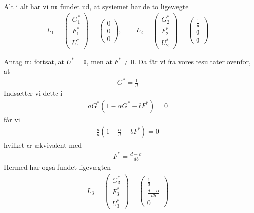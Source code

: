 \documentclass[12pt]{article}
\begin{document}
Alt i alt har vi nu fundet ud, at systemet har de to ligevægte
\begin{align}
L_1 = \begin{pmatrix}
G_1^* \\ F^*_1 \\ U_1^*
\end{pmatrix} = \begin{pmatrix}
0 \\ 0 \\ 0
\end{pmatrix}, \qquad 
L_2 = \begin{pmatrix}
G_2^* \\ F^*_2 \\ U_2^*
\end{pmatrix} = \begin{pmatrix}
\frac{1}{\alpha} \\ 0 \\ 0
\end{pmatrix}
\end{align}

Antag nu fortsat, at $U^*=0$, men at $F^* \neq 0$. Da får vi fra vores resultater ovenfor, at
\begin{align}
G^* = \frac{1}{d}
\end{align}
Indsætter vi dette i
\begin{align}
aG^*(1 - \alpha G^* - bF^*) = 0
\end{align}
får vi
\begin{align}
\frac{a}{d}(1 - \frac{\alpha}{d} - bF^*) = 0
\end{align}
hvilket er ækvivalent med
\begin{align}
F^* = \frac{d-\alpha}{db}
\end{align}
Hermed har også fundet ligevægten
\begin{align}
L_3 = \begin{pmatrix}
G_3^* \\ F^*_3 \\ U_3^*
\end{pmatrix} = \begin{pmatrix}
\frac{1}{d} \\ \frac{d-\alpha}{db} \\ 0
\end{pmatrix}
\end{align}
\end{document}
